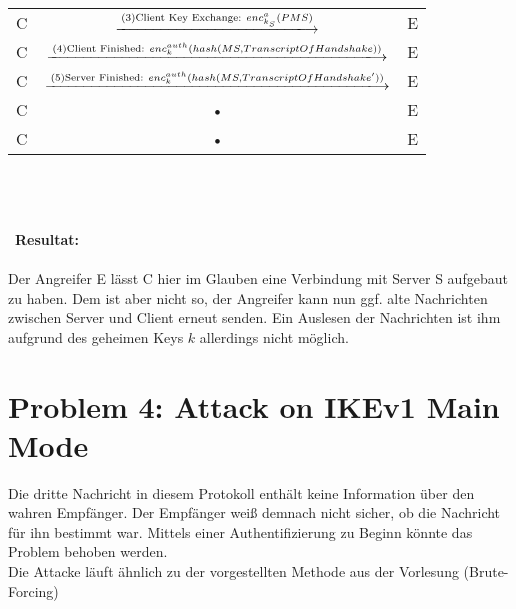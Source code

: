 \documentclass[12pt,pdftex,a4paper]{article}
\begin{document}
\begin{sidewaystable}[ph!]
\begin{tabular}{|c|c|c|}
		C &  $\xlongrightarrow{\text{(3)Client Key Exchange: } enc^{a}_{k_{S}}(PMS)}$  & E \\ 
		
		C &  $\xlongrightarrow{\text{(4)Client Finished: } enc_{k}^{auth}(hash(MS, TranscriptOfHandshake))}$  & E  \\ 
		
		C &  $\xlongrightarrow{\text{(5)Server Finished: } enc_{k}^{auth}(hash(MS, TranscriptOfHandshake'))}$ & E  \\ 
		C & • & E  \\ 
		C & • & E \\ 
\end{tabular} \\\\\\\
\textbf{Resultat:}\\\
\\
Der Angreifer E lässt C hier im Glauben eine Verbindung mit Server S aufgebaut zu haben. Dem ist aber nicht so, der Angreifer kann nun ggf. alte Nachrichten zwischen Server und Client erneut senden. Ein Auslesen der Nachrichten ist ihm aufgrund des geheimen Keys $k$ allerdings nicht möglich.
\end{sidewaystable}
\clearpage

\section*{Problem 4: Attack on IKEv1 Main Mode}

Die dritte Nachricht in diesem Protokoll enthält keine Information über den wahren Empfänger. Der Empfänger weiß demnach nicht sicher, ob die Nachricht für ihn bestimmt war. Mittels einer Authentifizierung zu Beginn könnte das Problem behoben werden.\\
Die Attacke läuft ähnlich zu der vorgestellten Methode aus der Vorlesung (Brute-Forcing)
\\
\end{document}
